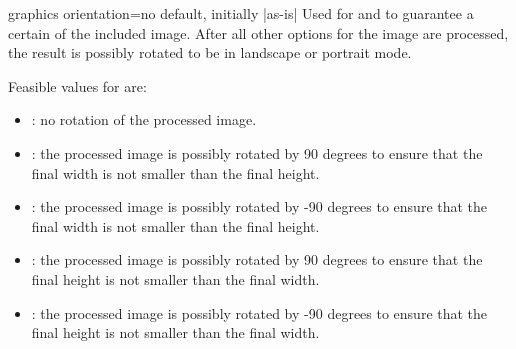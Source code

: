 \begin{docTcbKey}[][doc new=2018-03-21]{graphics orientation}{=}{no default, initially |as-is|}
  Used for  and  to
  guarantee a certain  of the included image.
  After all other options for the image are processed, the result is possibly
  rotated to be in landscape or portrait mode.

  Feasible values for  are:
  \begin{itemize}
  \item{}: no rotation of the processed image.
  \item{}:
    the processed image is possibly rotated by 90 degrees
    to ensure that the final width is not smaller than the final height.
  \item{}:
    the processed image is possibly rotated by -90 degrees
    to ensure that the final width is not smaller than the final height.
  \item{}:
    the processed image is possibly rotated by 90 degrees
    to ensure that the final height is not smaller than the final width.
  \item{}:
    the processed image is possibly rotated by -90 degrees
    to ensure that the final height is not smaller than the final width.
  \end{itemize}

\begin{dispExample}
\begin{tcbraster}[raster columns=6,size=fbox,raster equal height,
    colframe=red!50!black,colback=red!20!black,drop fuzzy shadow]
\end{tcbraster}
\end{dispExample}


\end{docTcbKey}


